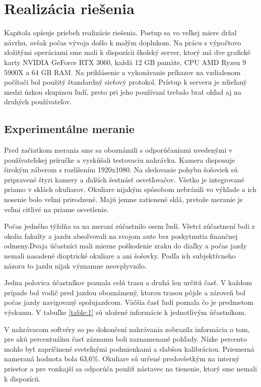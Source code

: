\usepackage[utf8]{inputenc}
\usepackage[T1]{fontenc}\chapter{Realizácia riešenia}\label{chap:research}

Kapitola opísuje priebeh realizácie riešenia. Postup sa vo veľkej miere držal návrhu, avšak počas vývoja došlo k malým doplnkom. Na prácu s výpočtovo zložitými operáciami sme mali k dispozícii školský server, ktorý má dve grafické karty NVIDIA GeForce RTX 3060, každá 12 GB pamäte, CPU AMD Ryzen 9 5900X a 64 GB RAM. Na prihlásenie a vykonávanie príkazov na vzdialenom počítači bol použitý štandardný sieťový protokol. Prístup k serveru je zdieľaný medzi úzkou skupinou ľudí, preto pri jeho používaní trebalo brať ohľad aj na druhých používateľov.

\section{Experimentálne meranie}

Pred začiatkom merania sme sa oboznámili s odporúčaniami uvedenými v používateľskej príručke a vyskúšali testovaciu nahrávku. Kamera disponuje širokým záberom s rozlíšením 1920x1080. Na sledovanie pohybu šošoviek sú pripravené štyri kamery a ďalších šestnásť osvetľovačov. Všetko je integrované priamo v sklách okuliarov. Okuliare nijakým spôsobom nebránili vo výhľade a ich nosenie bolo veľmi prirodzené. Majú jemne zatienené sklá, pretože meranie je veľmi citlivé na priame osvetlenie.

Počas jedného týždňa sa na meraní zúčastnilo osem ľudí. Všetci zúčastnení boli z okolia fakulty a jazdu absolvovali na svojom aute bez poskytnutia finančnej odmeny.Dvaja účastníci mali mierne poškodenie zraku do diaľky a počas jazdy nemali nasadené dioptrické okuliare a ani šošovky. Podľa ich subjektívneho názoru to jazdu nijak významne neovplyvnilo.

Jedna polovica účastníkov poznala celú trasu a druhá len určitú časť. V každom prípade bol vodič pred jazdou oboznámený, ktorou trasou pôjde a zároveň bol počas jazdy navigovaný spolujazdcom. Väčšia časť ľudí poznala čo je predmetom výskumu. V tabuľke \ref{table:1} sú uložené informácie k jednotlivým účastníkom.

V nahrávacom softvéry so po dokončení nahrávania zobrazila informácia o tom, pre akú percentuálnu časť záznamu boli zaznamenané pohľady. Nízke percento mohlo byť zapríčinené sveteľnými podmienkami a slabšou kalibráciou. Priemerná nameraná hodnota bola 63,6\%. Okuliare sú určené predovšetkým na interný priestor a pre vonkajší sa odporúča použiť nástavec na tienenie, ktorý sme nemali k dispozícii.

